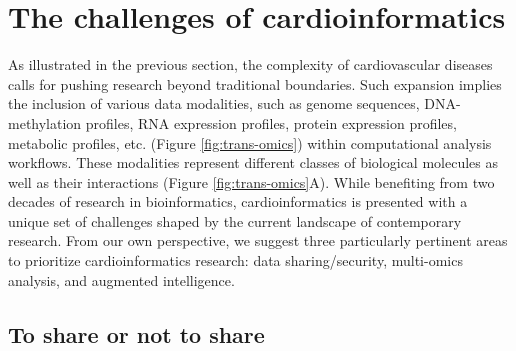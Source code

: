 \documentclass[letter]{bioinfo}
\begin{document}
	\section*{The challenges of cardioinformatics}
	As illustrated in the previous section, the complexity of cardiovascular diseases calls for pushing research beyond traditional boundaries.
	Such expansion implies the inclusion of various data modalities, such as genome sequences, DNA-methylation profiles, RNA expression profiles, protein expression profiles, metabolic profiles, etc. (Figure \ref{fig:trans-omics}) within computational analysis workflows. These modalities represent different classes of biological molecules as well as their interactions (Figure \ref{fig:trans-omics}A). While benefiting from two decades of research in bioinformatics, cardioinformatics is presented with a unique set of challenges shaped by the current landscape of contemporary research. From our own perspective, we suggest three particularly pertinent areas to prioritize cardioinformatics research: data sharing/security, multi-omics analysis, and augmented intelligence.
	
	
	\subsection*{To share or not to share}
	
\end{document}
